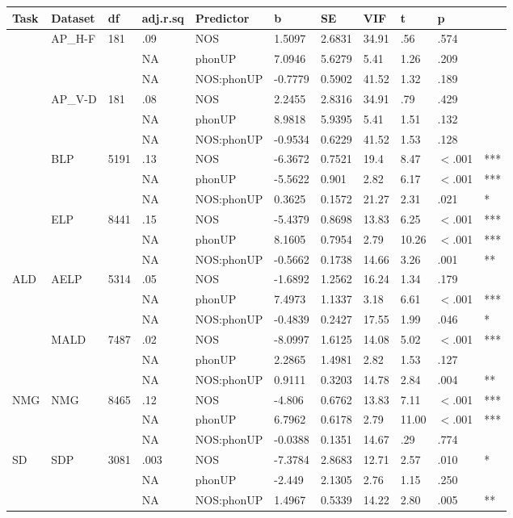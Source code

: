 \begin{table}[ht]
\centering
\begingroup\normalsize
\begin{tabular}{lllllllllll}
  \hline
Task & Dataset & df & adj.r.sq & Predictor & b & SE & VIF & t & p &  \\ 
  \hline
 & AP\_H-F & 181 & .09 & NOS & 1.5097 & 2.6831 & 34.91 & .56 & .574 &   \\ 
   &  &  & NA & phonUP & 7.0946 & 5.6279 & 5.41 & 1.26 & .209 &   \\ 
   &  &  & NA & NOS:phonUP & -0.7779 & 0.5902 & 41.52 & 1.32 & .189 &   \\ 
   & AP\_V-D & 181 & .08 & NOS & 2.2455 & 2.8316 & 34.91 & .79 & .429 &   \\ 
   &  &  & NA & phonUP & 8.9818 & 5.9395 & 5.41 & 1.51 & .132 &   \\ 
   &  &  & NA & NOS:phonUP & -0.9534 & 0.6229 & 41.52 & 1.53 & .128 &   \\ 
   & BLP & 5191 & .13 & NOS & -6.3672 & 0.7521 & 19.4 & 8.47 & $<$.001 & *** \\ 
   &  &  & NA & phonUP & -5.5622 & 0.901 & 2.82 & 6.17 & $<$.001 & *** \\ 
   &  &  & NA & NOS:phonUP & 0.3625 & 0.1572 & 21.27 & 2.31 & .021 & * \\ 
   & ELP & 8441 & .15 & NOS & -5.4379 & 0.8698 & 13.83 & 6.25 & $<$.001 & *** \\ 
   &  &  & NA & phonUP & 8.1605 & 0.7954 & 2.79 & 10.26 & $<$.001 & *** \\ 
   &  &  & NA & NOS:phonUP & -0.5662 & 0.1738 & 14.66 & 3.26 & .001 & ** \\ 
  ALD & AELP & 5314 & .05 & NOS & -1.6892 & 1.2562 & 16.24 & 1.34 & .179 &   \\ 
   &  &  & NA & phonUP & 7.4973 & 1.1337 & 3.18 & 6.61 & $<$.001 & *** \\ 
   &  &  & NA & NOS:phonUP & -0.4839 & 0.2427 & 17.55 & 1.99 & .046 & * \\ 
   & MALD & 7487 & .02 & NOS & -8.0997 & 1.6125 & 14.08 & 5.02 & $<$.001 & *** \\ 
   &  &  & NA & phonUP & 2.2865 & 1.4981 & 2.82 & 1.53 & .127 &   \\ 
   &  &  & NA & NOS:phonUP & 0.9111 & 0.3203 & 14.78 & 2.84 & .004 & ** \\ 
  NMG & NMG & 8465 & .12 & NOS & -4.806 & 0.6762 & 13.83 & 7.11 & $<$.001 & *** \\ 
   &  &  & NA & phonUP & 6.7962 & 0.6178 & 2.79 & 11.00 & $<$.001 & *** \\ 
   &  &  & NA & NOS:phonUP & -0.0388 & 0.1351 & 14.67 & .29 & .774 &   \\ 
  SD & SDP & 3081 & .003 & NOS & -7.3784 & 2.8683 & 12.71 & 2.57 & .010 & * \\ 
   &  &  & NA & phonUP & -2.449 & 2.1305 & 2.76 & 1.15 & .250 &   \\ 
   &  &  & NA & NOS:phonUP & 1.4967 & 0.5339 & 14.22 & 2.80 & .005 & ** \\ 
   \hline
\end{tabular}
\endgroup
\end{table}
